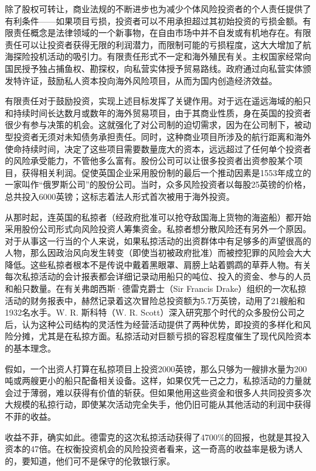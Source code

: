 \documentclass[12pt,oneside]{book}
\begin{document}
\begin{mdframed}
除了股权可转让，商业法规的不断进步也为减少个体风险投资者的个人责任提供了有利条件——如果项目亏损，投资者可以不用承担超过其初始投资的亏损金额。有限责任概念是法律领域的一个新事物，在自由市场中并不自发或有机地存在。有限责任可以让投资者获得无限的利润潜力，而限制可能的亏损程度，这大大增加了航海探险投机活动的吸引力。有限责任形式不一定和海外殖民有关。主权国家经常向国民授予独占捕鱼权、勘探权，向私营实体授予贸易路线。政府通过向私营实体颁发特许证，鼓励私人资本投向海外风险项目，从而为国内创造经济效益。

有限责任对于鼓励投资，实现上述目标发挥了关键作用。对于远在遥远海域的船只和持续时间长达数月或数年的海外贸易项目，由于其商业性质，身在英国的投资者很少有参与决策的机会。这就强化了对公司制的迫切需求，因为在公司制下，被动型投资者无须对未知债务承担责任。同时，这种商业项目所涉及的航行距离和海外使命持续时间，决定了这些项目需要数量庞大的资本，远远超过了任何单个投资者的风险承受能力，不管他多么富有。股份公司可以让很多投资者出资参股某个项目，获得相关利润。促使英国企业采用股份制的最后一个推动因素是1553年成立的一家叫作“俄罗斯公司”的股份公司。当时，众多风险投资者以每股25英镑的价格，总共投入6000英镑；这标志着法人形式首次被用于海外投资。

从那时起，连英国的私掠者（经政府批准可以抢夺敌国海上货物的海盗船）都开始采用股份公司形式向风险投资人筹集资金。私掠者想分散风险还有另外一个原因。对于从事这一行当的个人来说，如果私掠活动的出资群体中有足够多的声望很高的人物，那么因政治风向发生转变（即使当初被政府批准）而被控犯罪的风险会大大降低。这些私掠者根本不是传说中戴着黑眼罩、肩膀上站着鹦鹉的草莽人物。有关每次私掠活动的会计报表都会详细记录动用船只的吨位、投入的资金、参与的人员和船只数量。在有关弗朗西斯·德雷克爵士（Sir Francis Drake）组织的一次私掠活动的财务报表中，赫然记录着这次冒险总投资额为5.7万英镑，动用了21艘船和1932名水手。W. R. 斯科特（W. R. Scott）深入研究那个时代的众多股份公司之后，认为这种公司结构的灵活性为经营活动提供了两种优势，即投资的多样化和风险分摊，尤其是在私掠方面。私掠活动对巨额亏损的容忍程度催生了现代风险资本的基本理念。

假如，一个出资人打算在私掠项目上投资2000英镑，那么只够为一艘排水量为200吨或两艘更小的船只配备相关设备。这样，如果仅凭一己之力，私掠活动的力量就会过于薄弱，难以获得有价值的斩获。但如果他用这些资金和很多人共同投资多次大规模的私掠行动，即使某次活动完全失手，他仍旧可能从其他活动的利润中获得不菲的收益。

收益不菲，确实如此。德雷克的这次私掠活动获得了4700\%的回报，也就是其投入资本的47倍。在权衡投资机会的风险投资者看来，这一奇高的收益率是极为诱人的，要知道，他们可不是保守的伦敦银行家。


\end{mdframed}
\end{document}
